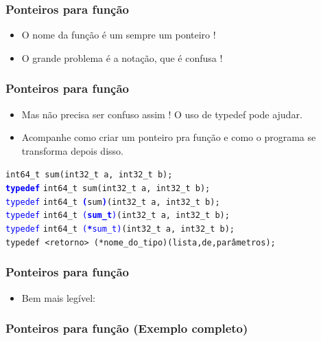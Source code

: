 \documentclass{beamer}
\begin{document}
\begin{frame}
	\frametitle{Ponteiros para função}
	\begin{itemize}
		\item O nome da função é um sempre um ponteiro !
		\item O grande problema é a notação, que é confusa !
	\end{itemize}
	
\end{frame}

\begin{frame}
	\frametitle{Ponteiros para função}
	\begin{itemize}
		\item Mas não precisa ser confuso assim ! O uso de typedef pode ajudar.
		\item Acompanhe como criar um ponteiro pra função e como o programa se transforma depois disso.
	\end{itemize}
	\vspace*{0.5cm}
    {\scriptsize
\texttt{int64\_t sum(int32\_t a, int32\_t b);} \\
\texttt{\textcolor{blue}{\textbf{typedef}}} \texttt{int64\_t sum(int32\_t a, int32\_t b);} \\
\texttt{\textcolor{blue}{typedef}} \texttt{int64\_t \texttt{\textcolor{blue}{\textbf{(}}}sum\texttt{\textcolor{blue}{\textbf{)}}}(int32\_t a, int32\_t b);} \\
\texttt{\textcolor{blue}{typedef}} \texttt{int64\_t \texttt{\textcolor{blue}{(\textbf{sum\_t})}}(int32\_t a, int32\_t b);} \\
\texttt{\textcolor{blue}{typedef}} \texttt{int64\_t \texttt{\textcolor{blue}{(\textbf{*}sum\_t)}}(int32\_t a, int32\_t b);} \\
\vspace*{0.5cm}
\texttt{typedef <retorno> (*nome\_do\_tipo)(lista,de,parâmetros);}
}
\end{frame}

\begin{frame}
	\frametitle{Ponteiros para função}
	\begin{itemize}
		\item Bem mais legível:
	\end{itemize}
	
\end{frame}

\begin{frame}
	\frametitle{Ponteiros para função (Exemplo completo)}
	
\end{frame}
\end{document}
